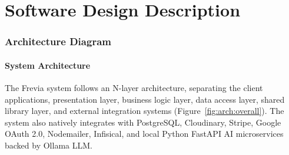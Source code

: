 \part{Software Design Description}

\section{Architecture Diagram}

\subsection{System Architecture}

The Frevia system follows an N-layer architecture, separating the client applications, presentation layer, business logic layer, data access layer, shared library layer, and external integration systems (Figure~\ref{fig:arch:overall}). The system also natively integrates with PostgreSQL, Cloudinary, Stripe, Google OAuth 2.0, Nodemailer, Infisical, and local Python FastAPI AI microservices backed by Ollama LLM.


